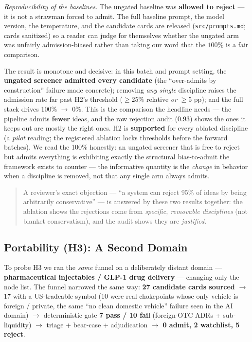 \documentclass[11pt]{article}
\begin{document}
\noindent\emph{Reproducibility of the baselines.} The ungated baseline was \textbf{allowed to
reject} --- it is not a strawman forced to admit. The full baseline prompt, the model version, the
temperature, and the candidate cards are released (\texttt{src/prompts.md}; cards sanitized) so a
reader can judge for themselves whether the ungated arm was unfairly admission-biased rather than
taking our word that the $100\%$ is a fair comparison.

The result is monotone and decisive: in this batch and prompt setting, the
\textbf{ungated screener admitted every candidate} (the ``over-admits by construction'' failure made concrete);
removing \emph{any single} discipline raises the admission rate far past H2's
threshold ($\geq 25\%$ relative \emph{or} $\geq 5$ pp); and the full stack
drives 100\% $\to$ 0\%.
This is the comparison the headline needs --- the pipeline admits \textbf{fewer}
ideas, and the raw rejection audit (0.93) shows the ones it keeps out are mostly
the right ones.
H2 is \textbf{supported} for every ablated discipline (a \emph{pilot} reading;
the registered ablation locks thresholds before the forward batches).
We read the 100\% honestly: an ungated screener that is free to reject but admits
everything is exhibiting exactly the structural bias-to-admit the framework
exists to counter --- the informative quantity is the \emph{change} in behavior
when a discipline is removed, not that any single arm always admits.

\begin{quote}
A reviewer's exact objection --- ``a system can reject 95\% of ideas by being
arbitrarily conservative'' --- is answered by these two results together: the
ablation shows the rejections come from \emph{specific, removable disciplines}
(not blanket conservatism), and the audit shows they are \emph{justified}.
\end{quote}

\subsection{Portability (H3): A Second Domain}

To probe H3 we ran the \emph{same} funnel on a deliberately distant domain ---
\textbf{pharmaceutical injectables / GLP-1 drug delivery} --- changing only the
node list. The funnel narrowed the same way: \textbf{27 candidate cards sourced}
$\to$ 17 with a US-tradeable symbol (10 were real chokepoints whose only vehicle
is foreign / private, the same ``no clean domestic vehicle'' failure seen in the
AI domain) $\to$ deterministic gate \textbf{7 pass / 10 fail} (foreign-OTC ADRs +
sub-liquidity) $\to$ triage + bear-case + adjudication $\to$ \textbf{0 admit, 2
watchlist, 5 reject}.
\end{document}
